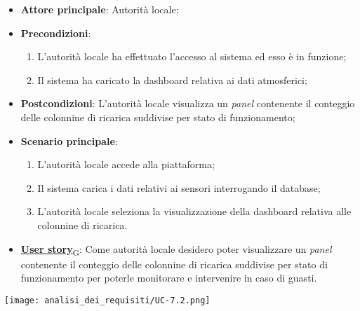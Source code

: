 \begin{itemize}
	\item \textbf{Attore principale}: Autorità locale;
	\item \textbf{Precondizioni}:
	      \begin{enumerate}
		      \item L'autorità locale ha effettuato l'accesso al sistema ed esso è in funzione;
		      \item Il sistema ha caricato la dashboard relativa ai dati atmosferici;
	      \end{enumerate}
	\item \textbf{Postcondizioni}: L'autorità locale visualizza un \textit{panel} contenente il conteggio delle colonnine di ricarica suddivise per stato di funzionamento;
	\item \textbf{Scenario principale}:
	      \begin{enumerate}
		      \item L'autorità locale accede alla piattaforma;
		      \item Il sistema carica i dati relativi ai sensori interrogando il database;
		      \item L'autorità locale seleziona la visualizzazione della dashboard relativa alle colonnine di ricarica.
	      \end{enumerate}
	\item \href{https://7last.github.io/docs/rtb/documentazione-interna/glossario\#user-story}{\textbf{User story}\textsubscript{G}}:
	      Come autorità locale desidero poter visualizzare un \textit{panel} contenente il conteggio delle colonnine di ricarica suddivise per stato di funzionamento
	      per poterle monitorare e intervenire in caso di guasti.
\end{itemize}
\begin{center}
	\texttt{[image: analisi\_dei\_requisiti/UC-7.2.png]}
\end{center}

